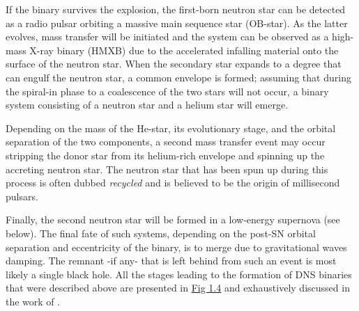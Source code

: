\documentclass[../../main/thesis_msc.tex]{subfiles}
\begin{document}
				If the binary survives the explosion, the first-born neutron star can be detected as a radio pulsar orbiting a massive main sequence star (OB-star). As the latter evolves, mass transfer will be initiated and the system can be observed as a high-mass X-ray binary (HMXB) due to the accelerated infalling material onto the surface of the neutron star. When the secondary star expands to a degree that can engulf the neutron star, a common envelope is formed; assuming that during the spiral-in phase to a coalescence of the two stars will not occur, a binary system consisting of a neutron star and a helium star will emerge.
				
				Depending on the mass of the He-star, its evolutionary stage, and the orbital separation of the two components, a second mass transfer event may occur stripping the donor star from its helium-rich envelope and spinning up the accreting neutron star. The neutron star that has been spun up during this process is often dubbed \emph{recycled} and is believed to be the origin of millisecond pulsars.
				
				Finally, the second neutron star will be formed in a low-energy supernova (see below). The final fate of such systems, depending on the post-SN orbital separation and eccentricity of the binary, is to merge due to gravitational waves damping. The remnant -if any- that is left behind from such an event is most likely a single black hole. All the stages leading to the formation of DNS binaries that were described above are presented in \hyperref[fig:DNS]{Fig 1.4} and exhaustively discussed in the work of \cite{Tauris2017}.
				
\end{document}
